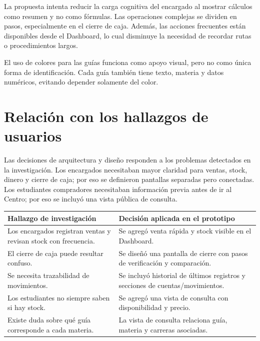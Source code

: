 ﻿\documentclass[12pt,letterpaper]{article}
\begin{document}
La propuesta intenta reducir la carga cognitiva del encargado al mostrar cálculos como resumen y no como fórmulas. Las operaciones complejas se dividen en pasos, especialmente en el cierre de caja. Además, las acciones frecuentes están disponibles desde el Dashboard, lo cual disminuye la necesidad de recordar rutas o procedimientos largos.

El uso de colores para las guías funciona como apoyo visual, pero no como única forma de identificación. Cada guía también tiene texto, materia y datos numéricos, evitando depender solamente del color.

\section{Relación con los hallazgos de usuarios}

Las decisiones de arquitectura y diseño responden a los problemas detectados en la investigación. Los encargados necesitaban mayor claridad para ventas, stock, dinero y cierre de caja; por eso se definieron pantallas separadas pero conectadas. Los estudiantes compradores necesitaban información previa antes de ir al Centro; por eso se incluyó una vista pública de consulta.

\begin{center}
\begin{tabularx}{\textwidth}{|B{5cm}|Y|}
\hline
Hallazgo de investigación & Decisión aplicada en el prototipo \\
\hline
Los encargados registran ventas y revisan stock con frecuencia. & Se agregó venta rápida y stock visible en el Dashboard. \\
\hline
El cierre de caja puede resultar confuso. & Se diseñó una pantalla de cierre con pasos de verificación y comparación. \\
\hline
Se necesita trazabilidad de movimientos. & Se incluyó historial de últimos registros y secciones de cuentas/movimientos. \\
\hline
Los estudiantes no siempre saben si hay stock. & Se agregó una vista de consulta con disponibilidad y precio. \\
\hline
Existe duda sobre qué guía corresponde a cada materia. & La vista de consulta relaciona guía, materia y carreras asociadas. \\
\hline
\end{tabularx}
\end{center}
\end{document}
